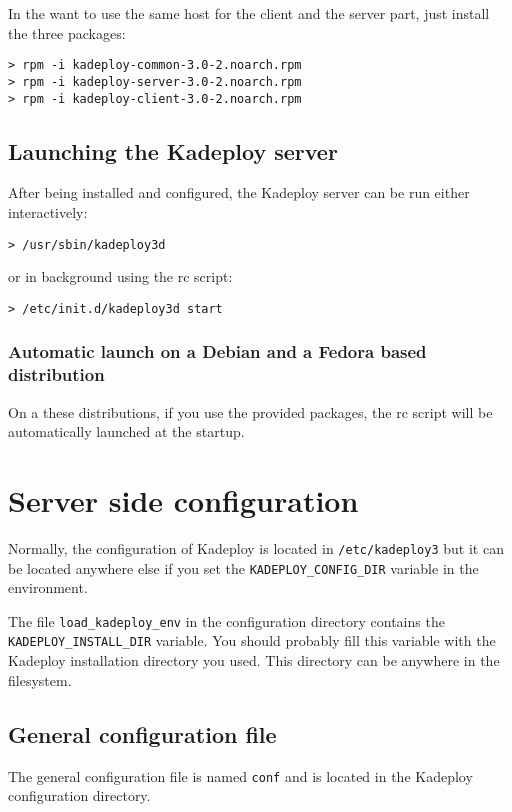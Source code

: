 \documentclass[a4wide,10pt,oneside]{book}
\begin{document}
\noindent In the want to use the same host for the client and the server part, just install the three packages:
\begin{small}
\begin{verbatim}
> rpm -i kadeploy-common-3.0-2.noarch.rpm
> rpm -i kadeploy-server-3.0-2.noarch.rpm
> rpm -i kadeploy-client-3.0-2.noarch.rpm
\end{verbatim}
\end{small}


\section{Launching the Kadeploy server}
After being installed and configured, the Kadeploy server can be run either interactively:
\begin{small}
\begin{verbatim}
> /usr/sbin/kadeploy3d
\end{verbatim}
\end{small}
\noindent or in background using the rc script:
\begin{small}
\begin{verbatim}
> /etc/init.d/kadeploy3d start
\end{verbatim}
\end{small}

\subsection{Automatic launch on a Debian and a Fedora based distribution}
\noindent On a these distributions, if you use the provided packages, the rc script will be automatically launched at the startup.

\chapter{Server side configuration}
Normally, the configuration of Kadeploy is located in \texttt{/etc/kadeploy3} but it can be located anywhere else if you set the \texttt{KADEPLOY\_CONFIG\_DIR} variable in the environment.

The file \texttt{load\_kadeploy\_env} in the configuration directory contains the \texttt{KADEPLOY\_INSTALL\_DIR} variable. You should probably fill this variable with the Kadeploy installation directory you used. This directory can be anywhere in the filesystem.

\section{General configuration file}\label{sec:general_config}
The general configuration file is named \texttt{conf} and is located in the Kadeploy configuration directory.
\end{document}
